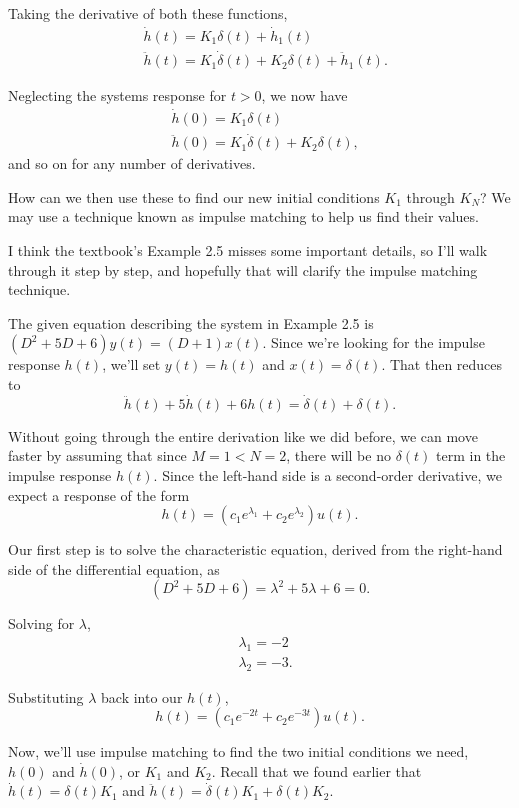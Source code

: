 \documentclass{article}
\begin{document}
Taking the derivative of both these functions, 
\begin{align*}
	& \dot{h}(t) = K_1\delta(t) + \dot{h}_1(t) \\
	& \ddot{h}(t) = K_1\dot{\delta}(t) + K_2\delta(t) + \ddot{h}_1(t).
\end{align*}

Neglecting the systems response for \(t>0\), we now have 
\begin{align*}
	&\dot{h}(0) = K_1\delta(t) \\
	&\ddot{h}(0) = K_1\dot{\delta}(t) + K_2\delta(t),
\end{align*}
and so on for any number of derivatives.

How can we then use these to find our new initial conditions \(K_1\) through \(K_N\)? We may use a technique known as impulse matching to help us find their values. 

I think the textbook's Example 2.5 misses some important details, so I'll walk through it step by step, and hopefully that will clarify the impulse matching technique.

The given equation describing the system in Example 2.5 is \((D^2 + 5D + 6)y(t) = (D+1)x(t)\). Since we're looking for the impulse response \(h(t)\), we'll set \(y(t) = h(t)\) and \(x(t) = \delta(t)\). That then reduces to \[
	\ddot{h}(t) + 5\dot{h}(t) + 6h(t) = \dot{\delta}(t) + \delta(t).
\]

Without going through the entire derivation like we did before, we can move faster by assuming that since \(M=1< N=2\), there will be no \(\delta(t)\) term in the impulse response \(h(t)\). Since the left-hand side is a second-order derivative, we expect a response of the form \[
	h(t) = (c_1e^{\lambda_1} + c_2e^{\lambda_2})u(t).
\]

Our first step is to solve the characteristic equation, derived from the right-hand side of the differential equation, as \[
	(D^2 + 5D + 6) = \lambda^2 + 5\lambda + 6 = 0.
\]
 
Solving for \(\lambda\), \begin{align*}
  &\lambda_1 = -2 \\
	&\lambda_2 = -3.
\end{align*}

Substituting \(\lambda\) back into our \(h(t)\), \[
	h(t) = (c_1e^{-2t} + c_2e^{-3t})u(t).
\]

Now, we'll use impulse matching to find the two initial conditions we need, \({h}(0)\) and \(\dot{h}(0)\), or \(K_1\) and \(K_2\). Recall that we found earlier that \(\dot{h}(t) = \delta(t)K_1\) and \(\ddot{h}(t) = \dot{\delta}(t)K_1 + \delta(t)K_2\).
\end{document}
